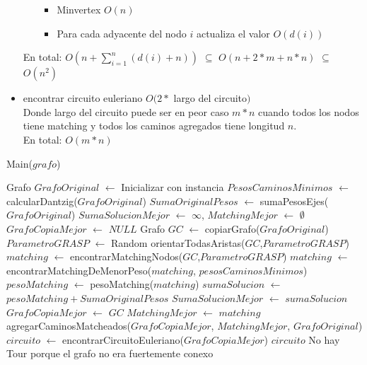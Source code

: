 \documentclass[11pt, a4paper, spanish]{article}
\begin{document}
\begin{itemize}
\begin{itemize}
		\begin{itemize}
			\item Minvertex $O(n)$
			\item Para cada adyacente del nodo $i$ actualiza el valor $O(d(i))$
		\end{itemize}
	\end{itemize}
	En total: $O(n + \sum_{i=1}^{n}{(d(i) + n)})$ $\subseteq$ $O(n + 2*m + n*n)$ $\subseteq$ $O(n^{2})$
	\item encontrar circuito euleriano $O(2 *$ largo del circuito$)$\\
	Donde largo del circuito puede ser en peor caso $m*n$ cuando todos los nodos tiene matching y todos los caminos agregados tiene longitud $n$.\\
	En total: $O(m*n)$
\end{itemize}
\newpage

\begin{algorithm}
	\caption{Main($grafo$)}
	\begin{algorithmic}
	\STATE Grafo $GrafoOriginal$ $\gets$ Inicializar con instancia
		\STATE $PesosCaminosMinimos$ $\gets$ calcularDantzig($GrafoOriginal$)
		\STATE $SumaOriginalPesos$ $\gets$ sumaPesosEjes($GrafoOriginal$)
		\STATE $SumaSolucionMejor$ $\gets$ $\infty$, $MatchingMejor$ $\gets$ $\emptyset$
		\STATE $GrafoCopiaMejor$ $\gets$ $NULL$
			\STATE Grafo $GC$ $\gets$ copiarGrafo($GrafoOriginal$)
			\STATE $ParametroGRASP$ $\gets$ Random
			\STATE orientarTodasAristas($GC$,$ParametroGRASP$)
			\STATE $matching$ $\gets$ encontrarMatchingNodos($GC$,$ParametroGRASP$)
				\STATE $matching$ $\gets$ encontrarMatchingDeMenorPeso($matching$, $pesosCaminosMinimos$)
			\ENDWHILE
			\STATE $pesoMatching$ $\gets$ pesoMatching($matching$)
			\STATE $sumaSolucion$ $\gets$ $pesoMatching + SumaOriginalPesos$
				\STATE $SumaSolucionMejor$ $\gets$ $sumaSolucion$
				\STATE $GrafoCopiaMejor$ $\gets$ $GC$
				\STATE $MatchingMejor$ $\gets$ $matching$
			\ENDIF
		\ENDWHILE
		\STATE agregarCaminosMatcheados($GrafoCopiaMejor$, $MatchingMejor$, $GrafoOriginal$)
		\STATE $circuito$ $\gets$ encontrarCircuitoEuleriano($GrafoCopiaMejor$)
		\RETURN $circuito$
	\ELSE
		\RETURN No hay Tour porque el grafo no era fuertemente conexo
	\ENDIF
	\end{algorithmic}
\end{algorithm}
\end{document}
